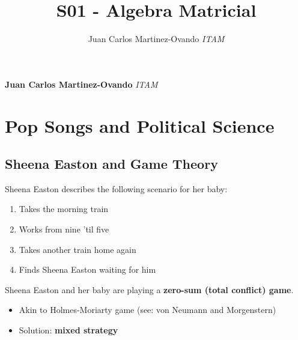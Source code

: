 \documentclass[11pt,]{article}
\title{S01 - Algebra Matricial  }
\author{\Large Juan Carlos Martinez-Ovando\vspace{0.05in} \newline\normalsize\emph{ITAM}  }
\date{}
\newcommand*{\authorfont}{\fontfamily{phv}\selectfont}
\providecommand{\tightlist}{%
\setlength{\itemsep}{0pt}\setlength{\parskip}{0pt}}
\begin{document}
	
%

{%
\setlength{\parindent}{0pt}
\thispagestyle{plain}
{\fontsize{18}{20}\selectfont\raggedright 
\maketitle  %

}

{
   \vskip 13.5pt\relax \normalsize\fontsize{11}{12} 
\textbf{\authorfont Juan Carlos Martinez-Ovando} \hskip 15pt \emph{\small ITAM}   

}

}






\vskip 6.5pt


\noindent  \section{Pop Songs and Political
Science}\label{pop-songs-and-political-science}

\subsection{Sheena Easton and Game
Theory}\label{sheena-easton-and-game-theory}

Sheena Easton describes the following scenario for her baby:

\begin{enumerate}
\def\labelenumi{\arabic{enumi}.}
\tightlist
\item
  Takes the morning train
\item
  Works from nine 'til five
\item
  Takes another train home again
\item
  Finds Sheena Easton waiting for him
\end{enumerate}

Sheena Easton and her baby are playing a \textbf{zero-sum (total
conflict) game}.

\begin{itemize}
\tightlist
\item
  Akin to Holmes-Moriarty game (see: von Neumann and Morgenstern)
\item
  Solution: \textbf{mixed strategy}
\end{itemize}
\end{document}
